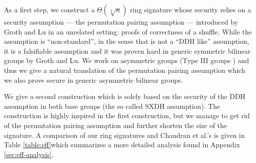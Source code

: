 As a first step, we construct a $\Theta(\sqrt[3]{n})$ ring signature whose security relies on a security assumption --- the {permutation pairing assumption} --- introduced by Groth and Lu \cite{AC:GroLu07} in an unrelated setting: proofs of correctness of a shuffle. While the assumption is ``non-standard'', in the sense that is not a ``DDH like'' assumption, it is a falsifiable assumption and it was proven hard in generic symmetric bilinear groups by Groth and Lu. We work on asymmetric groups (Type III groups \cite{EPRINT:GalPatSma06}) and thus we give a natural translation of the permutation pairing assumption which we also prove secure in generic asymmetric bilinear groups.

We give a second construction which is solely based on the security of the DDH assumption in both base groups (the so called SXDH assumption). The construction is highly inspired in the first construction, but we manage to get rid of the permutation pairing assumption and further shorten the size of the signature. 
A comparison of our ring signatures and Chandran et al.'s is given in Table \ref{table:eff}\ifPKC\else which summarizes a more detailed analysis found in Appendix \ref{sec:eff-analysis}\fi.

 


